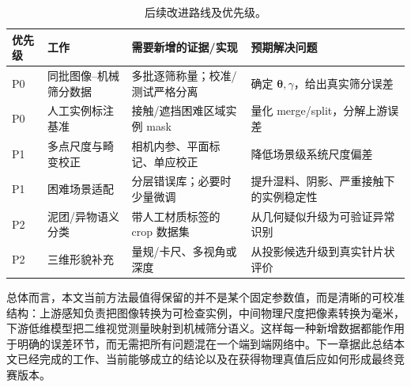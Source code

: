 \begin{table}[htbp]
\centering
\caption{后续改进路线及优先级。}
\label{tab:roadmap-priority}
\small
\renewcommand{\arraystretch}{1.15}
\begin{tabular}{>{\centering\arraybackslash}p{1.1cm}>{\raggedright\arraybackslash}p{3.6cm}>{\raggedright\arraybackslash}p{5.0cm}>{\raggedright\arraybackslash}p{3.9cm}}
\toprule
优先级 & 工作 & 需要新增的证据/实现 & 预期解决问题 \\
\midrule
P0 & 同批图像--机械筛分数据 & 多批逐筛称量；校准/测试严格分离 & 确定 $\boldsymbol{\theta},\gamma$，给出真实筛分误差 \\
P0 & 人工实例标注基准 & 接触/遮挡困难区域实例 mask & 量化 merge/split，分解上游误差 \\
P1 & 多点尺度与畸变校正 & 相机内参、平面标记、单应校正 & 降低场景级系统尺度偏差 \\
P1 & 困难场景适配 & 分层错误库；必要时少量微调 & 提升湿料、阴影、严重接触下的实例稳定性 \\
P2 & 泥团/异物语义分类 & 带人工材质标签的 crop 数据集 & 从几何疑似升级为可验证异常识别 \\
P2 & 三维形貌补充 & 量规/卡尺、多视角或深度 & 从投影候选升级到真实针片状评价 \\
\bottomrule
\end{tabular}
\end{table}

总体而言，本文当前方法最值得保留的并不是某个固定参数值，而是清晰的可校准结构：上游感知负责把图像转换为可检查实例，中间物理尺度把像素转换为毫米，下游低维模型把二维视觉测量映射到机械筛分语义。这样每一种新增数据都能作用于明确的误差环节，而无需把所有问题混在一个端到端网络中。下一章据此总结本文已经完成的工作、当前能够成立的结论以及在获得物理真值后应如何形成最终竞赛版本。
